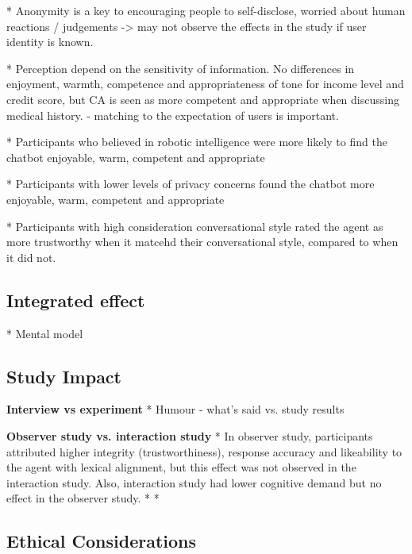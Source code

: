 \documentclass[sigconf,screen,review, anonymous]{acmart}
\newcommand{\cmt}[1]{}%
\begin{document}
* Anonymity is a key to encouraging people to self-disclose, worried about human reactions / judgements -> may not observe the effects in the study if user identity is known. \cite{lee2020hear}\cmt{[23]}

* Perception depend on the sensitivity of information. No differences in enjoyment, warmth, competence and appropriateness of tone for income level and credit score, but CA is seen as more competent and appropriate when discussing medical history. \cite{cox2022does}\cmt{[27]} - matching to the expectation of users is important.

* Participants who believed in robotic intelligence were more likely to find the chatbot enjoyable, warm, competent and appropriate \cite{cox2022does}\cmt{[27]}

* Participants with lower levels of privacy concerns found the chatbot more enjoyable, warm, competent and appropriate \cite{cox2022does}\cmt{[27]}

* Participants with high consideration conversational style rated the agent as more trustworthy when it matcehd their conversational style, compared to when it did not. \cite{hoegen2019end}\cmt{[31]}

\subsection{Integrated effect}

* Mental model

\subsection{Study Impact}

\textbf{Interview vs experiment}
* Humour - what's said vs. study results

\textbf{Observer study vs. interaction study}
* In observer study, participants attributed higher integrity (trustworthiness), response accuracy and likeability to the agent with lexical alignment, but this effect was not observed in the interaction study. Also, interaction study had lower cognitive demand but no effect in the observer study. \cite{linnemann2018can}\cmt{[15]}
* \cite{zhu2022effects}\cmt{[26]}
* \cite{cox2022does}\cmt{[27]}

\subsection{Ethical Considerations}
\end{document}
